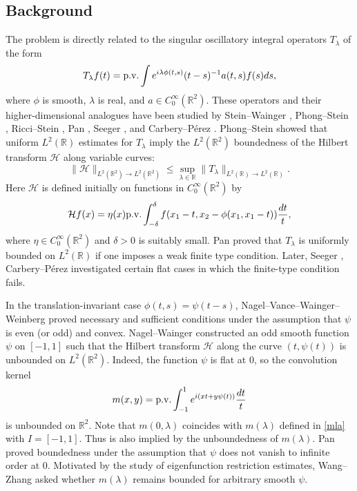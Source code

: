 \documentclass[11pt]{amsart}
\newcommand{\la}{\lambda}
\newcommand{\1}{{\rm 1\hspace*{-0.4ex}%
			\rule{0.1ex}{1.52ex}\hspace*{0.2ex}}}
\numberwithin{equation}{section}
\begin{document}
\subsection{Background}
The problem is directly related to the singular oscillatory integral operators $T_\lambda$ of the form
\begin{equation}\label{Tlambda}T_\lambda f(t)={\rm p.v.}\int e^{i\lambda\phi(t,s)}(t-s)^{-1}a(t,s)f(s)ds,\end{equation}
where $\phi$ is smooth, $\lambda$ is real, and $a\in C_0^\infty(\mathbb{R}^2)$.
These operators and their higher-dimensional analogues have been studied by Stein--Wainger \cite{sw70,sw78}, Phong--Stein \cite{ps86}, Ricci--Stein \cite{rs87}, Pan \cite{pan91}, Seeger \cite{seeger94}, and Carbery--P\'erez \cite{cp99}. Phong--Stein \cite[p.~117]{ps86} showed that uniform $L^2(\mathbb{R})$ estimates for $T_\lambda$ imply the $L^2(\mathbb{R}^2)$ boundedness of the Hilbert transform $\mathcal{H}$ along variable curves: 
\begin{equation}\label{ht}
	\|\mathcal{H}\|_{L^2(\mathbb{R}^2)\to L^2(\mathbb{R}^2)}\le \sup_{\lambda\in \mathbb{R}}\|T_\lambda\|_{L^2(\mathbb{R})\to L^2(\mathbb{R})}.
\end{equation} Here $\mathcal{H}$ is defined initially on functions in $C_0^\infty(\mathbb{R}^2)$ by
\[\mathcal{H}f(x)=\eta(x){\rm p.v.}\int_{-\delta}^{\delta}f(x_1-t,x_2-\phi(x_1,x_1-t))\frac{dt}{t},\]
where $\eta\in C_0^\infty(\mathbb{R}^2)$ and $\delta>0$ is suitably small. Pan \cite{pan91} proved that $T_\lambda$ is uniformly bounded on $L^2(\mathbb{R})$ if one imposes a weak finite type condition. Later, Seeger \cite{seeger94}, Carbery--P\'erez \cite{cp99} investigated certain flat cases in which the finite-type condition fails.

In the translation-invariant case $\phi(t,s)=\psi(t-s)$, Nagel--Vance--Wainger--Weinberg \cite{nvww} proved necessary and sufficient conditions under the assumption that $\psi$ is even (or odd) and convex. Nagel--Wainger \cite[Theorem 4.1]{nw} constructed an odd smooth function $\psi$ on $[-1,1]$ such that the Hilbert transform $\mathcal{H}$ along the curve $(t,\psi(t))$ is unbounded on $L^2(\mathbb{R}^2)$. Indeed, the function $\psi$ is flat at $0$, so the convolution kernel
\begin{equation}\label{nwker}
	m(x, y)={\rm p . v .} \int_{-1}^{1} e^{i(x t+y \psi(t))} \frac{d t}{t}
\end{equation}
is unbounded on $\mathbb{R}^2$. Note that $m(0,\la)$ coincides with $m(\la)$ defined in \eqref{mla} with $I=[-1,1]$. Thus \cite[Theorem 4.1]{nw} is also implied by the unboundedness of $m(\la)$. Pan \cite{pan93} proved boundedness under the assumption that $\psi$ does
not vanish to infinite order at $0$. Motivated by the study of eigenfunction restriction estimates, Wang--Zhang \cite[Problem 4 in Section 4]{wz21} asked whether $m(\lambda)$ remains bounded for arbitrary smooth $\psi$. 
\end{document}
